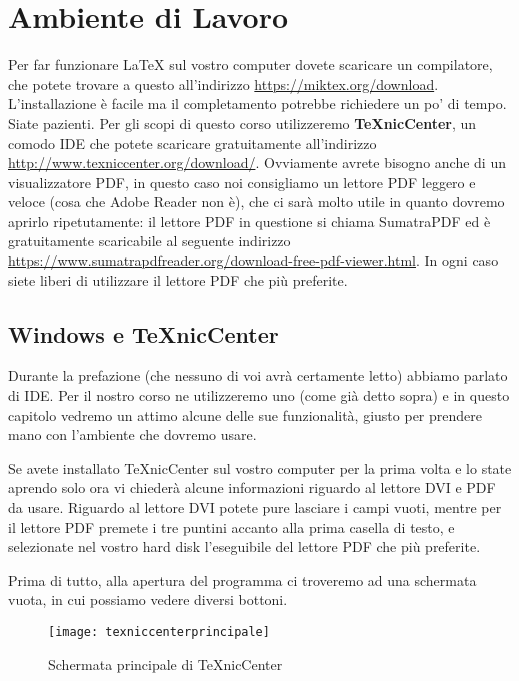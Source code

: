 \chapter{Ambiente di Lavoro}

Per far funzionare \LaTeX{} sul vostro computer dovete scaricare un
compilatore, che potete trovare a questo all'indirizzo
\url{https://miktex.org/download}. L'installazione è facile ma il completamento
potrebbe richiedere un po' di tempo. Siate pazienti.
Per gli scopi di questo corso utilizzeremo \textbf{TeXnicCenter}, un comodo IDE
che potete scaricare gratuitamente all'indirizzo
\url{http://www.texniccenter.org/download/}.
Ovviamente avrete bisogno anche di un visualizzatore PDF, in questo caso noi
consigliamo un lettore PDF leggero e veloce (cosa che Adobe Reader non è), che
ci sarà molto utile in quanto dovremo aprirlo ripetutamente: il lettore PDF in
questione si chiama SumatraPDF ed è gratuitamente scaricabile al seguente
indirizzo \url{https://www.sumatrapdfreader.org/download-free-pdf-viewer.html}.
In ogni caso siete liberi di utilizzare il lettore PDF che più preferite.

\section{Windows e TeXnicCenter}

Durante la prefazione (che nessuno di voi avrà certamente letto) abbiamo
parlato di IDE. Per il nostro corso ne utilizzeremo uno (come già detto sopra)
e in questo capitolo vedremo un attimo alcune delle sue funzionalità, giusto
per prendere mano con l'ambiente che dovremo usare.

Se avete installato TeXnicCenter sul vostro computer per la prima volta e lo
state aprendo solo ora vi chiederà alcune informazioni riguardo al lettore DVI
e PDF da usare. Riguardo al lettore DVI potete pure lasciare i campi vuoti,
mentre per il lettore PDF premete i tre puntini accanto alla prima casella di
testo, e selezionate nel vostro hard disk l'eseguibile del lettore PDF che più
preferite.

Prima di tutto, alla apertura del programma ci troveremo ad una schermata
vuota, in cui possiamo vedere diversi bottoni.

\begin{figure}[H]
  \centering
  \texttt{[image: texniccenterprincipale]}
  \caption{Schermata principale di TeXnicCenter}
  \label{img:principale_texcenter}
\end{figure}

